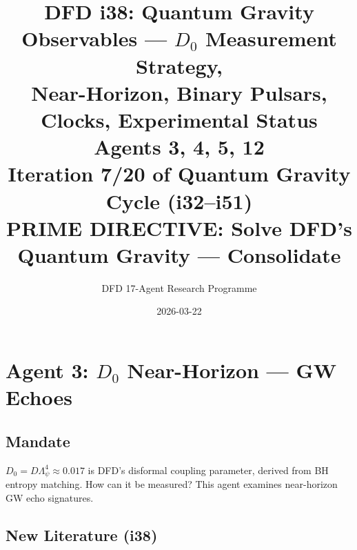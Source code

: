 \documentclass[11pt,a4paper]{article}
\title{DFD i38: Quantum Gravity Observables --- $D_0$ Measurement Strategy,\\Near-Horizon, Binary Pulsars, Clocks, Experimental Status\\[6pt]
\large Agents 3, 4, 5, 12\\[6pt]
\normalsize Iteration 7/20 of Quantum Gravity Cycle (i32--i51)\\
PRIME DIRECTIVE: Solve DFD's Quantum Gravity --- Consolidate}
\author{DFD 17-Agent Research Programme}
\date{2026-03-22}
\begin{document}
\maketitle
\tableofcontents
\newpage

\section{Agent 3: $D_0$ Near-Horizon --- GW Echoes}
\label{sec:agent3}

\subsection{Mandate}

$D_0 = D\Lambda_\psi^4 \approx 0.017$ is DFD's disformal coupling parameter, derived from BH entropy matching. How can it be measured? This agent examines near-horizon GW echo signatures.

\subsection{New Literature (i38)}
\end{document}
